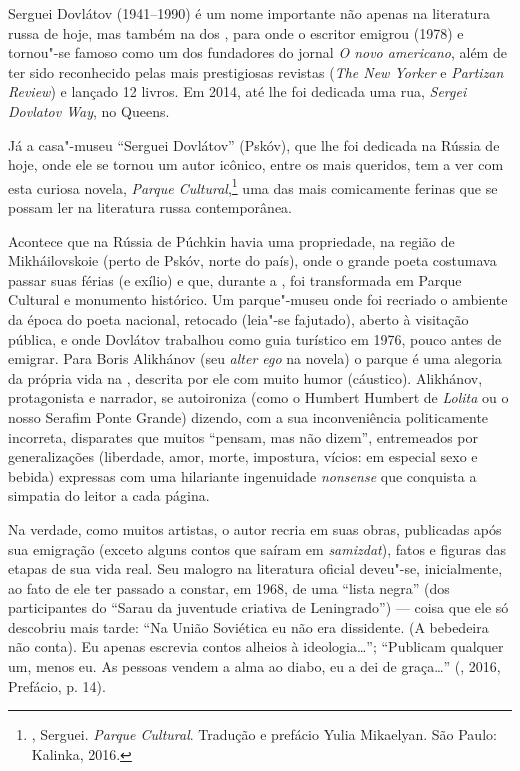Serguei Dovlátov (1941--1990) é um nome importante não apenas na
literatura russa de hoje, mas também na dos , para onde o escritor
emigrou (1978) e tornou"-se famoso como um dos fundadores do jornal \emph{O novo
americano}, além de ter sido reconhecido pelas mais prestigiosas revistas (\emph{The New
Yorker} e \emph{Partizan Review}) e lançado 12 livros. Em 2014, até lhe foi dedicada
uma rua, \emph{Sergei Dovlatov Way}, no Queens.

Já a casa"-museu ``Serguei Dovlátov'' (Pskóv), que lhe foi dedicada na Rússia de
hoje, onde ele se tornou um autor icônico, entre os mais queridos, tem a
ver com esta curiosa novela, \emph{Parque 
Cultural},\footnote{, Serguei. \emph{Parque Cultural}.
 Tradução e prefácio Yulia Mikaelyan. São Paulo: Kalinka, 2016.} uma das mais comicamente ferinas que se
possam ler na literatura russa contemporânea. 

Acontece que na Rússia de Púchkin havia uma propriedade, na região de Mikháilovskoie (perto de
Pskóv, norte do país), onde o grande poeta costumava passar suas
férias (e exílio) e que, durante a , foi transformada em
Parque Cultural e monumento histórico. Um parque"-museu onde foi
recriado o ambiente da época do poeta nacional, retocado (leia"-se
fajutado), aberto à visitação pública, e onde Dovlátov trabalhou
como guia turístico em 1976, pouco antes de emigrar.
Para Boris Alikhánov (seu \emph{alter ego} na novela) o parque é uma alegoria da própria
vida na , descrita por ele com muito humor (cáustico). 
Alikhánov, protagonista e narrador, se autoironiza (como o Humbert Humbert de
\emph{Lolita} ou o nosso Serafim Ponte Grande) dizendo, com a sua
inconveniência politicamente incorreta, disparates que muitos ``pensam,
mas não dizem'', entremeados por generalizações
(liberdade, amor, morte, impostura, vícios: em especial sexo e
bebida) expressas com uma hilariante ingenuidade \emph{nonsense} que
conquista a simpatia do leitor a cada página.

Na verdade, como muitos artistas, o autor recria em suas obras, publicadas
após sua emigração (exceto alguns contos que saíram em \emph{samizdat}), fatos e figuras das etapas de sua vida
real. Seu malogro na literatura oficial deveu"-se, inicialmente, ao fato de ele
ter passado a constar, em 1968, de uma ``lista negra'' (dos
participantes do ``Sarau da juventude criativa de Leningrado'') --- coisa
que ele só descobriu mais tarde: ``Na União Soviética eu não era
dissidente. (A bebedeira não conta). Eu apenas escrevia contos alheios à
ideologia\ldots{}''; ``Publicam qualquer um, menos eu. As pessoas vendem a alma ao
diabo, eu a dei de graça\ldots{}'' (, 2016, Prefácio, p. 14).

